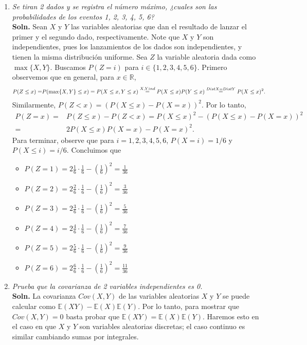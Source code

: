 \documentclass[letterpaper,11pt]{article}
\begin{document}
\begin{enumerate}
\item \emph{Se tiran 2 dados y se registra el número máximo, ¿cuales son las probabilidades de los eventos
    1, 2, 3, 4, 5, 6?}\\
    {\bf Soln.} Sean $X$ y $Y$ las variables aleatorias que dan el resultado de lanzar el primer y el segundo
    dado, respectivamente. Note que $X$ y $Y$ son independientes, pues los lanzamientos de los dados son
    independientes, y tienen la misma distribución uniforme. Sea $Z$ la variable aleatoria dada como $\max \{X,Y\}$.
    Buscamos $P(Z=i)$ para $i\in\{1,2,3,4,5,6\}$. 
    Primero observemos que en general, para $x\in \mathbb R$,
    \begin{align*}
        P(Z\leq x)=& P(\max\{X,Y\}\leq x)=P(X\leq x,Y\leq x)\stackrel{X,Y\newline ind}{=}P(X\leq x)P(Y\leq
        x)\stackrel{Dist X=Dist Y }{=}P(X\leq x)^2.
    \end{align*}
    Similarmente, $P(Z<x)=(P(X\leq x)-P(X=x))^2$.
    Por lo tanto, 
    \begin{align*}
        P(Z=x)= & P(Z\leq x)-P(Z<x)=P(X\leq x)^2-(P(X\leq x)-P(X=x))^2\\
        =& 2P(X\leq x)P(X=x)-P(X=x)^2.
    \end{align*}
    Para terminar, observe que para $i=1,2,3,4,5,6$, $P(X=i)=1/6$ y $P(X\leq i)=i/6$. Concluimos que
    \begin{itemize}
        \item $P(Z=1)=2\frac{1}{6}\cdot\frac{1}{6}-(\frac{1}{6})^2=\frac{1}{36}$
        \item $P(Z=2)=2\frac{2}{6}\cdot\frac{1}{6}-(\frac{1}{6})^2=\frac{3}{36}$
        \item $P(Z=3)=2\frac{3}{6}\cdot\frac{1}{6}-(\frac{1}{6})^2=\frac{5}{36}$
        \item $P(Z=4)=2\frac{4}{6}\cdot\frac{1}{6}-(\frac{1}{6})^2=\frac{7}{36}$
        \item $P(Z=5)=2\frac{5}{6}\cdot\frac{1}{6}-(\frac{1}{6})^2=\frac{9}{36}$
        \item $P(Z=6)=2\frac{6}{6}\cdot\frac{1}{6}-(\frac{1}{6})^2=\frac{11}{36}$
    \end{itemize}

\item \emph{Prueba que la covarianza de 2 variables independientes es 0.}\\
    {\bf Soln.} La covarianza $Cov(X,Y)$ de las variables aleatorias $X$ y $Y$ se puede calcular como 
    $\mathbb E(XY)-\mathbb E(X)\mathbb E(Y)$.  Por lo tanto, para mostrar que $Cov(X,Y)=0$ basta probar 
    que $\mathbb E(XY)=\mathbb E(X)
    \mathbb E(Y)$. Haremos esto en el caso en que $X$ y $Y$ son variables aleatorias discretas; el caso continuo
    es similar cambiando sumas por integrales. 
    

\end{enumerate}
\end{document}

